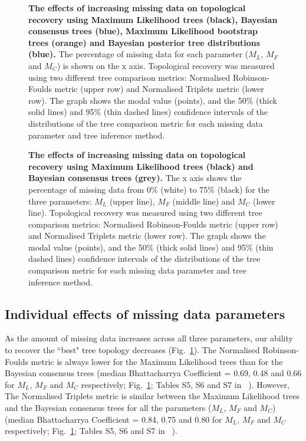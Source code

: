 \documentclass[10pt,letterpaper]{article}
\begin{document}
\begin{figure}[]
\caption{{\bf The effects of increasing missing data on topological recovery using Maximum Likelihood trees (black), Bayesian consensus trees (blue), Maximum Likelihood bootstrap trees (orange) and Bayesian posterior tree distributions (blue).}
 The percentage of missing data for each parameter ($M_{L}$, $M_{F}$ and $M_{C}$) is shown on the x axis. Topological recovery was measured using two different tree comparison metrics: Normalised Robinson-Foulds metric (upper row) and Normalised Triplets metric (lower row). The graph shows the modal value (points), and the 50\% (thick solid lines) and 95\% (thin dashed lines) confidence intervals of the distributions of the tree comparison metric for each missing data parameter and tree inference method.}
\label{Fig_Results-permeth_perparam} 
\end{figure}

\begin{figure}[]
\caption{{\bf The effects of increasing missing data on topological recovery using Maximum Likelihood trees (black) and Bayesian consensus trees (grey).}
 The x axis shows the percentage of missing data from 0\% (white) to 75\% (black) for the three parameters: $M_{L}$ (upper line), $M_{F}$ (middle line) and $M_{C}$ (lower line). Topological recovery was measured using two different tree comparison metrics: Normalised Robinson-Foulds metric (upper row) and Normalised Triplets metric (lower row). The graph shows the modal value (points), and the 50\% (thick solid lines) and 95\% (thin dashed lines) confidence intervals of the distributions of the tree comparison metric for each missing data parameter and tree inference method.} 
\label{Fig_Results-global_perparam}
\end{figure}

\subsection*{Individual effects of missing data parameters}
As the amount of missing data increases across all three parameters, our ability to recover the ``best" tree topology decreases (Fig.~\ref{Fig_Results-permeth_perparam}).
The Normalised Robinson-Foulds metric is always lower for the Maximum Likelihood trees than for the Bayesian consensus trees (median Bhattacharrya Coefficient = 0.69, 0.48 and 0.66 for $M_{L}$, $M_{F}$ and $M_{C}$ respectively; Fig.~\ref{Fig_Results-permeth_perparam}; Tables S5, S6 and S7 in ~). 
However, The Normalised Triplets metric is similar between the Maximum Likelihood trees and the Bayesian consensus trees for all the parameters ($M_{L}$, $M_{F}$ and $M_{C}$) (median Bhattacharrya Coefficient = 0.84, 0.75 and 0.80 for $M_{L}$, $M_{F}$ and $M_{C}$ respectively; Fig.~\ref{Fig_Results-permeth_perparam}; Tables S5, S6 and S7 in ~).
\end{document}
